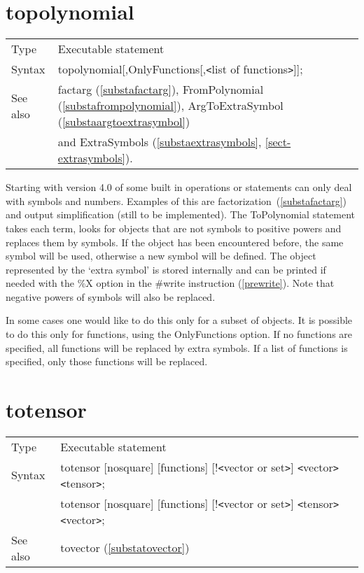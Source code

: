 \section{topolynomial}
\label{substatopolynomial}

\noindent \begin{tabular}{ll}
Type & Executable statement\\
Syntax & topolynomial[,OnlyFunctions[,{\tt<}list of functions{\tt>}]];
\\ See also & factarg (\ref{substafactarg}), FromPolynomial 
(\ref{substafrompolynomial}), ArgToExtraSymbol (\ref{substaargtoextrasymbol}) 
\\& and ExtraSymbols (\ref{substaextrasymbols},
\ref{sect-extrasymbols}).
\end{tabular} \vspace{4mm}

\noindent Starting with version 4.0 of \FORM{} some built in operations or
statements can only deal with symbols and numbers. Examples of this are 
factorization~(\ref{substafactarg}) and output simplification (still to be 
implemented). The ToPolynomial statement takes each term, looks for objects 
that are not symbols to positive powers and replaces them by symbols. If 
the object has been encountered before, the same symbol will be used, 
otherwise a new symbol will be defined. The object represented by the 
`extra symbol' is stored internally and can be printed if needed with the 
\%X option in the \#write instruction (\ref{prewrite}). Note that negative 
powers of symbols will also be replaced.

In some cases one would like to do this only for a subset of objects. It is 
possible to do this only for functions, using the OnlyFunctions option. If 
no functions are specified, all functions will be replaced by extra 
symbols. If a list of functions is specified, only those functions will be 
replaced.
\vspace{10mm}


\section{totensor}
\label{substatotensor}

\noindent \begin{tabular}{ll}
Type & Executable statement\\
Syntax & totensor [nosquare] [functions] [!{\tt<}vector or set{\tt>}] {\tt<}vector{\tt>} {\tt<}tensor{\tt>}; \\
       & totensor [nosquare] [functions] [!{\tt<}vector or set{\tt>}] {\tt<}tensor{\tt>} {\tt<}vector{\tt>};
\\ See also & tovector (\ref{substatovector})
\end{tabular} \vspace{4mm}

